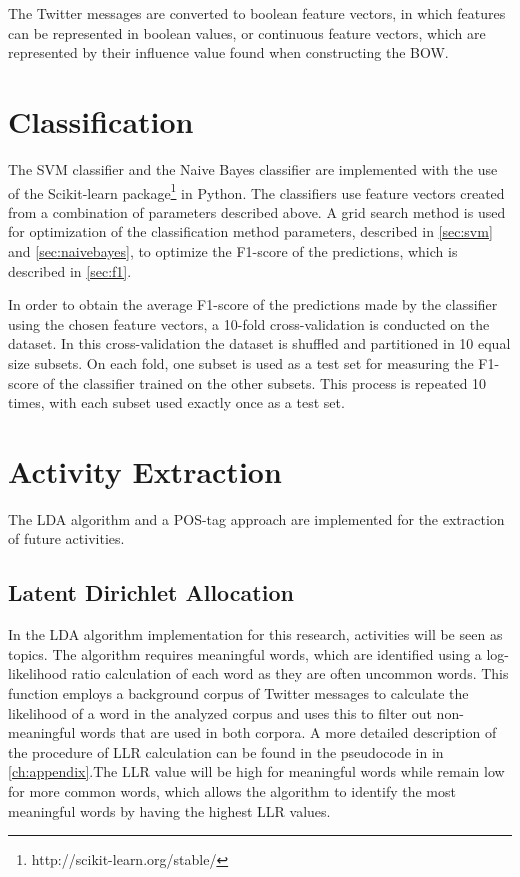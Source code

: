The Twitter messages are converted to boolean feature vectors, in which features can be represented in boolean values, or continuous feature vectors, which are represented by their influence value found when constructing the BOW.

\section{Classification}\label{sec:clf}
The SVM classifier and the Naive Bayes classifier are implemented with the use of the Scikit-learn package\footnote{http://scikit-learn.org/stable/} in Python. The classifiers use feature vectors created from a combination of parameters described above. A grid search method is used for optimization of the classification method parameters, described in \autoref{sec:svm} and \autoref{sec:naivebayes}, to optimize the F1-score of the predictions, which is described in \autoref{sec:f1}. 

In order to obtain the average F1-score of the predictions made by the classifier using the chosen feature vectors, a 10-fold cross-validation is conducted on the dataset. In this cross-validation the dataset is shuffled and partitioned in 10 equal size subsets. On each fold, one subset is used as a test set for measuring the F1-score of the classifier trained on the other subsets. This process is repeated 10 times, with each subset used exactly once as a test set.

\section{Activity Extraction}\label{sec:extraction}
The LDA algorithm and a POS-tag approach are implemented for the extraction of future activities.

\subsection{Latent Dirichlet Allocation}
In the LDA algorithm implementation for this research, activities will be seen as topics. The algorithm requires meaningful words, which are identified using a log-likelihood ratio calculation of each word as they are often uncommon words. This function employs a background corpus of Twitter messages to calculate the likelihood of a word in the analyzed corpus and uses this to filter out non-meaningful words that are used in both corpora. A more detailed description of the procedure of LLR calculation can be found in the pseudocode in  in \autoref{ch:appendix}.The LLR value will be high for meaningful words while remain low for more common words, which allows the algorithm to identify the most meaningful words by having the highest LLR values.

